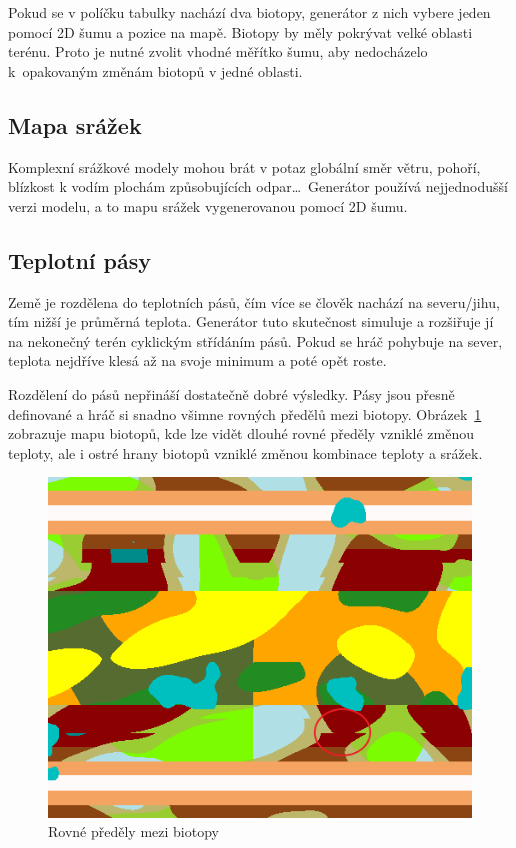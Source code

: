 \documentclass[thesis=M,czech]{FITthesis}[2019/12/23]
\begin{document}
Pokud se v políčku tabulky nachází dva biotopy, generátor z nich vybere jeden pomocí 2D šumu a pozice na mapě. Biotopy by měly pokrývat velké oblasti terénu. Proto je nutné zvolit vhodné měřítko šumu, aby nedocházelo k~opakovaným změnám biotopů v jedné oblasti.

\subsection{Mapa srážek}

Komplexní srážkové modely mohou brát v potaz globální směr větru, pohoří, blízkost k vodím plochám způsobujících odpar\dots ~Generátor používá nejjednodušší verzi modelu, a to mapu srážek vygenerovanou pomocí 2D šumu.

\subsection{Teplotní pásy} \label{sec:temp_band}

Země je rozdělena do teplotních pásů, čím více se člověk nachází na severu/jihu, tím nižší je průměrná teplota. Generátor tuto skutečnost simuluje a rozšiřuje jí na nekonečný terén cyklickým střídáním pásů. Pokud se hráč pohybuje na sever, teplota nejdříve klesá až na svoje minimum a poté opět roste.

Rozdělení do pásů nepřináší dostatečně dobré výsledky. Pásy jsou přesně definované a hráč si snadno všimne rovných předělů mezi biotopy. Obrázek~\ref{fig:biomes_old} zobrazuje mapu biotopů, kde lze vidět dlouhé rovné předěly vzniklé změnou teploty, ale i ostré hrany biotopů vzniklé změnou kombinace teploty a srážek.

\begin{figure}\centering
	\includegraphics[width=\textwidth]{images/world_gen/biomes_old}
	\caption[Rovné předěly mezi biotopy]{Rovné předěly mezi biotopy}\label{fig:biomes_old}
\end{figure}
\end{document}

